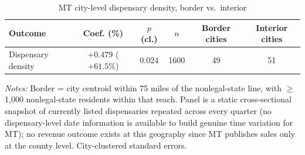 \begin{table}[htbp]
\centering
\caption{MT city-level dispensary density, border vs.\ interior}
\label{tab:mt_city_density}
\footnotesize
\begin{tabular}{lccccc}
\toprule
Outcome & Coef. (\%) & $p$ (cl.) & $n$ & Border cities & Interior cities \\
\midrule
Dispensary density & $+0.479$ ($+61.5\%$) & 0.024 & 1600 & 49 & 51 \\
\bottomrule
\end{tabular}
\begin{minipage}{0.95\textwidth}
\vspace{0.3em}
\footnotesize
\textit{Notes:} Border = city centroid within 75 miles of the nonlegal-state line, with $\geq$1,000
nonlegal-state residents within that reach. Panel is a static cross-sectional snapshot of currently
listed dispensaries repeated across every quarter
(no dispensary-level date information is available to build genuine time variation for MT); no revenue outcome exists at this geography since MT publishes sales
only at the county level. City-clustered standard errors.
\end{minipage}
\end{table}
